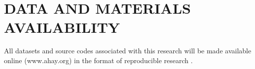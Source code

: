 \section{DATA AND MATERIALS AVAILABILITY}
All datasets and source codes associated with this research will be made available online (www.ahay.org) in the format of reproducible research \cite[]{mada2013}.

















